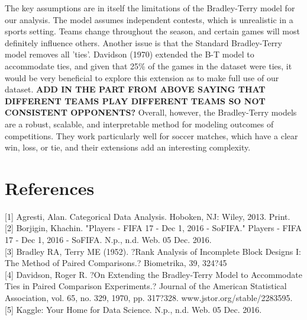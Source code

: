 \documentclass{article}
\begin{document}
The key assumptions are in itself the limitations of the Bradley-Terry model for our analysis. The model assumes independent contests, which is unrealistic in a sports setting. Teams change throughout the season, and certain games will most definitely influence others. Another issue is that the Standard Bradley-Terry model removes all 'ties'. Davidson (1970) extended the B-T model to accommodate ties, and given that 25\% of the games in the dataset were ties, it would be very beneficial to explore this extension as to make full use of our dataset. \textbf{ADD IN THE PART FROM ABOVE SAYING THAT DIFFERENT TEAMS PLAY DIFFERENT TEAMS SO NOT CONSISTENT OPPONENTS?} Overall, however, the Bradley-Terry models are a robust, scalable, and interpretable method for modeling outcomes of competitions. They work particularly well for soccer matches, which have a clear win, loss, or tie, and their extensions add an interesting complexity.

\section{References}

[1] Agresti, Alan. Categorical Data Analysis. Hoboken, NJ: Wiley, 2013. Print.\\

[2] Borjigin, Khachin. "Players - FIFA 17 - Dec 1, 2016 - SoFIFA." Players - FIFA 17 - Dec 1, 2016 - SoFIFA. N.p., n.d. Web. 05 Dec. 2016.\\

[3] Bradley RA, Terry ME (1952). ?Rank Analysis of Incomplete Block Designs I: The Method
of Paired Comparisons.? Biometrika, 39, 324?45\\

[4] Davidson, Roger R. ?On Extending the Bradley-Terry Model to Accommodate Ties in Paired Comparison Experiments.? Journal of the American Statistical Association, vol. 65, no. 329, 1970, pp. 317?328. www.jstor.org/stable/2283595.\\

[5] Kaggle: Your Home for Data Science. N.p., n.d. Web. 05 Dec. 2016.\\
\end{document}
